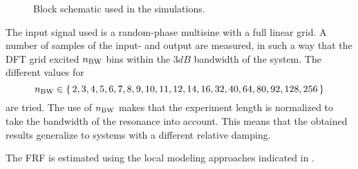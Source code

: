 \begin{figure}
 \centering
  
  \caption{Block schematic used in the simulations. }
  \label{fig:nparam:blockH0}
\end{figure}

The input signal used is a random-phase multisine with a full linear grid.
A number of samples of the input- and output are measured, in such a way that the \gls{DFT} grid excited $n_{\mathrm{BW}}$ bins within the $3\unit{dB}$ bandwidth of the system.
The different values for 
\[n_{\mathrm{BW}} \in \set{2, 3, 4, 5, 6, 7, 8, 9, 10, 11, 12, 14, 16, 32, 40, 64, 80, 92, 128, 256}\] are tried. 
The use of $n_{\mathrm{BW}}$ makes that the experiment length is normalized to take the bandwidth of the resonance into account.
This means that the obtained results generalize to systems with a different relative damping.

The \gls{FRF} is estimated using the local modeling approaches indicated in .


